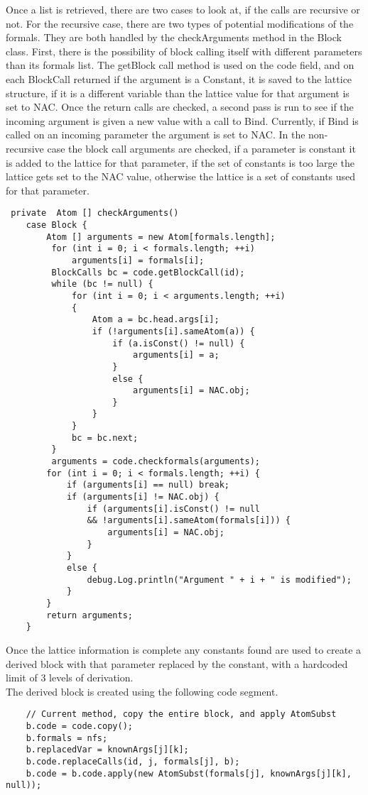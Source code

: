\documentclass[14pt]{article}
\begin{document}
Once a list is retrieved, there are two cases to look at, if the calls are recursive or not. For the recursive case, there are two types of potential modifications of the formals.
	They are both handled by the checkArguments method in the Block class. First, there is the possibility
	of block calling itself with different parameters than its formals list. 
	The getBlock call method is used on the code field, and on each BlockCall returned if the argument is
	a Constant, it is saved to the lattice structure, if it is a different variable than the lattice value
	for that argument is set to NAC.
	Once the return calls are checked, a second pass is run to see if the incoming argument
	is given a new value with a call to Bind. Currently, if Bind is called on an incoming parameter
	the argument is set to NAC. In the non-recursive case the block call arguments are checked, if a parameter is constant it is added to the lattice for that parameter, if the set of constants is too large the lattice gets set to the NAC value, otherwise the lattice is a set of constants used for that parameter.
\begin{verbatim}
 private  Atom [] checkArguments() 
    case Block {
        Atom [] arguments = new Atom[formals.length];
         for (int i = 0; i < formals.length; ++i)
             arguments[i] = formals[i];
         BlockCalls bc = code.getBlockCall(id);
         while (bc != null) {
             for (int i = 0; i < arguments.length; ++i)
             {
                 Atom a = bc.head.args[i];
                 if (!arguments[i].sameAtom(a)) {
                     if (a.isConst() != null) {
                         arguments[i] = a;
                     }
                     else {
                         arguments[i] = NAC.obj;
                     } 
                 }
             }
             bc = bc.next;
         }
         arguments = code.checkformals(arguments);
        for (int i = 0; i < formals.length; ++i) {
            if (arguments[i] == null) break;
            if (arguments[i] != NAC.obj) {
                if (arguments[i].isConst() != null
                && !arguments[i].sameAtom(formals[i])) {
                    arguments[i] = NAC.obj;
                }
            }
            else {
                debug.Log.println("Argument " + i + " is modified");
            }
        }
        return arguments;        
    }
\end{verbatim}
Once the lattice information is complete any constants found are used to create a derived block with that parameter replaced by the constant, with a hardcoded limit of 3 levels of derivation.\\
The derived block is created using the following code segment.
\begin{verbatim}
	// Current method, copy the entire block, and apply AtomSubst
	b.code = code.copy();
	b.formals = nfs;
	b.replacedVar = knownArgs[j][k];
	b.code.replaceCalls(id, j, formals[j], b);	
	b.code = b.code.apply(new AtomSubst(formals[j], knownArgs[j][k], null));
\end{verbatim}
\end{document}
